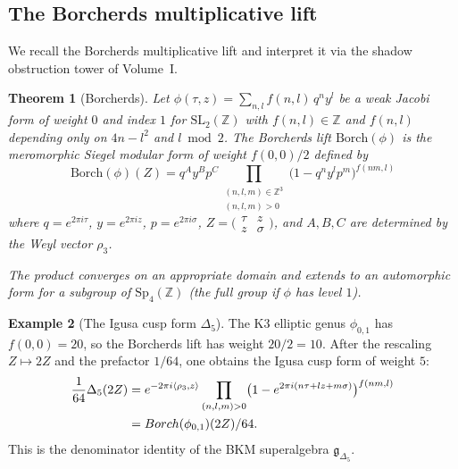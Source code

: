 \documentclass[11pt]{article}
\theoremstyle{plain}
\newtheorem{theorem}{Theorem}[section]
\theoremstyle{definition}
\newtheorem{example}[theorem]{Example}
\theoremstyle{remark}
\begin{document}
\subsection{The Borcherds multiplicative lift}
\label{subsec:borcherds-lift}

We recall the Borcherds multiplicative lift and interpret it via the shadow obstruction tower of Volume~I.

\begin{theorem}[Borcherds]
\label{thm:borcherds-lift}
Let $\phi(\tau, z) = \sum_{n, l} f(n, l) \, q^n y^l$ be a weak Jacobi form of
weight $0$ and index $1$ for $\mathrm{SL}_2(\mathbb{Z})$ with
$f(n, l) \in \mathbb{Z}$ and $f(n, l)$ depending only on $4n - l^2$ and $l \bmod 2$.
The Borcherds lift $\mathrm{Borch}(\phi)$ is the meromorphic Siegel modular form
of weight $f(0,0)/2$ defined by
\begin{equation}\label{eq:borcherds-product}
 \mathrm{Borch}(\phi)(Z)
 = q^A y^B p^C \prod_{\substack{(n,l,m) \in \mathbb{Z}^3 \\ (n,l,m) > 0}}
 \bigl(1 - q^n y^l p^m\bigr)^{f(nm, l)}
\end{equation}
where $q = e^{2\pi i \tau}$, $y = e^{2\pi i z}$, $p = e^{2\pi i \sigma}$,
$Z = \bigl(\begin{smallmatrix} \tau & z \\ z & \sigma \end{smallmatrix}\bigr)$,
and $A, B, C$ are determined by the Weyl vector $\rho_3$.

The product converges on an appropriate domain and extends to an automorphic form
for a subgroup of $\mathrm{Sp}_4(\mathbb{Z})$ (the full group if $\phi$ has
level $1$).
\end{theorem}

\begin{example}[The Igusa cusp form $\Delta_5$]
\label{ex:igusa-from-borcherds}
The K3 elliptic genus $\phi_{0,1}$ has $f(0, 0) = 20$, so the Borcherds lift
has weight $20/2 = 10$. After the rescaling $Z \mapsto 2Z$ and the prefactor
$1/64$, one obtains the Igusa cusp form of weight $5$:
\begin{align}\label{eq:delta5-product}
 \frac{1}{64} \Delta_5(2Z)
 &= e^{-2\pi i \langle \rho_3, z \rangle}
 \prod_{\substack{(n,l,m) > 0}} \bigl(1 - e^{2\pi i(n\tau + lz + m\sigma)}\bigr)^{f(nm, l)} \\
 &= \mathrm{Borch}(\phi_{0,1})(2Z) / 64. \notag
\end{align}
This is the denominator identity of the BKM superalgebra
$\mathfrak{g}_{\Delta_5}$.
\end{example}
\end{document}

